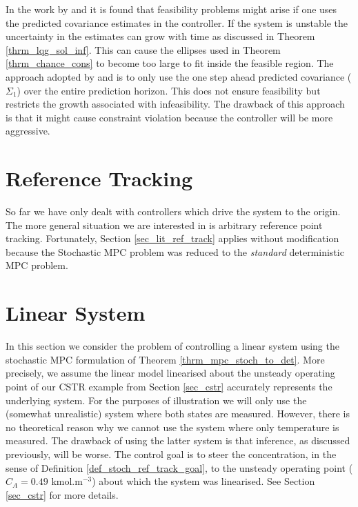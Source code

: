 In the work by \cite{yan1} and \cite{yan2} it is found that feasibility problems might arise if one uses the predicted covariance estimates in the controller. If the system is unstable the uncertainty in the estimates can grow with time as discussed in Theorem \ref{thrm_lqg_sol_inf}. This can cause the ellipses used in Theorem \ref{thrm_chance_cons} to become too large to fit inside the feasible region. The approach adopted by \cite{yan1} and \cite{yan2} is to only use the one step ahead predicted covariance ($\Sigma_1$) over the entire prediction horizon. This does not ensure feasibility but restricts the growth associated with infeasibility. The drawback of this approach is that it might cause constraint violation because the controller will be more aggressive.  
\section{Reference Tracking}
So far we have only dealt with controllers which drive the system to the origin. The more general situation we are interested in is arbitrary reference point tracking. Fortunately, Section \ref{sec_lit_ref_track} applies without modification because the Stochastic MPC problem was reduced to the \textit{standard} deterministic MPC problem. 

\section{Linear System}
\label{sec_lin_sys_cont}
In this section we consider the problem of controlling a linear system using the stochastic MPC formulation of Theorem \ref{thrm_mpc_stoch_to_det}. More precisely, we assume the linear model linearised about the unsteady operating point of our CSTR example from Section \ref{sec_cstr} accurately represents the underlying system. For the purposes of illustration we will only use the (somewhat unrealistic) system where both states are measured. However, there is no theoretical reason why we cannot use the system where only temperature is measured. The drawback of using the latter system is that inference, as discussed previously, will be worse. The control goal is to steer the concentration, in the sense of Definition \ref{def_stoch_ref_track_goal}, to the unsteady operating point ($C_A = 0.49$ kmol.m$^{-3}$) about which the system was linearised. See Section \ref{sec_cstr} for more details.


